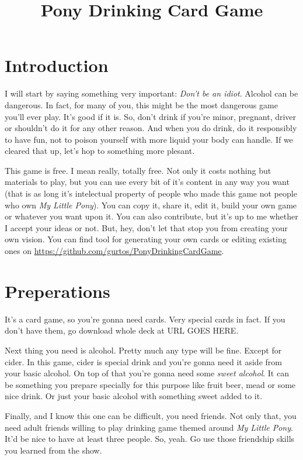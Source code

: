 \documentclass[notitlepage]{article}
\title{Pony Drinking Card Game}
\begin{document}
\maketitle
\section{Introduction}
I will start by saying something very important: \textsl{Don't be an idiot}. Alcohol can be dangerous. In fact, for many of you, this might be the most dangerous game you'll ever play. It's good if it is. So, don't drink if you're minor, pregnant, driver or shouldn't do it for any other reason. And when you do drink, do it responsibly to have fun, not to poison yourself with more liquid your body can handle. If we cleared that up, let's hop to something more plesant.

This game is free. I mean really, totally free. Not only it costs nothing but materials to play, but you can use every bit of it's content in any way you want (that is as long it's intelectual property of people who made this game not people who own \textsl{My Little Pony}). You can copy it, share it, edit it, build your own game or whatever you want upon it. You can also contribute, but it's up to me whether I accept your ideas or not. But, hey, don't let that stop you from creating your own vision. You can find tool for generating your own cards or editing existing ones on \url{https://github.com/gurtos/PonyDrinkingCardGame}.

\section{Preperations}
It's a card game, so you're gonna need cards. Very special cards in fact. If you don't have them, go download whole deck at URL GOES HERE.

Next thing you need is alcohol. Pretty much any type will be fine. Except for cider. In this game, cider is special drink and you're gonna need it aside from your basic alcohol. On top of that you're gonna need some \textsl{sweet alcohol}. It can be something you prepare specially for this purpose like fruit beer, mead or some nice drink. Or just your basic alcohol with something sweet added to it.

Finally, and I know this one can be difficult, you need friends. Not only that, you need adult friends willing to play drinking game themed around \textsl{My Little Pony}. It'd be nice to have at least three people. So, yeah. Go use those friendship skills you learned from the show.
\end{document}
